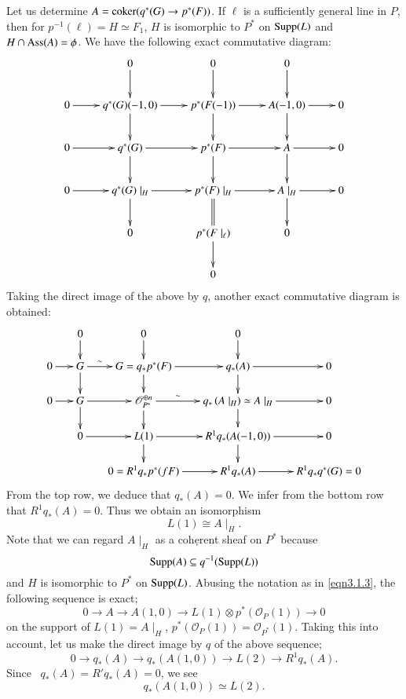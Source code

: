 Let us determine $A=\operatorname{coker} (q^{\ast}(G)\to p^{\ast}(F))$. If
$\ell$ is a sufficiently general line in $P$, then for
$p^{-1}(\ell)=H\simeq F_1$, $H$ is isomorphic to $P^{\ast}$ on
$\mathrm{Supp}(L)$ and $H\cap\mathrm{Ass} (A)=\phi$. We have the following exact
commutative diagram:
$$
\xymatrix{& 0\ar[d] & 0\ar[d] & 0\ar[d] &\\
0\ar[r]&q^{\ast}(G)(-1,0)\ar[d]\ar[r]&p^{\ast}(F(-1))\ar[d]\ar[r]&A(-1,0)\ar[d]\ar[r]&0\\
0\ar[r]&q^{\ast}(G)\ar[d]\ar[r]&p^{\ast}(F)\ar[d]\ar[r]&A\ar[d]\ar[r]&0\\
0\ar[r]&q^{\ast}(G)\mid_{H}\ar[d]\ar[r]&p^{\ast}(F)\mid_{H}\ar@{=}[d]\ar[r]&A\mid_{H}\ar[d]\ar[r]&0\\
& 0 &p^{\ast}(F\mid_{\ell})\ar[d]& 0 &\\
& & 0 & &}
$$\pageoriginale
Taking the direct image of the above by $q$, another exact commutative
diagram is obtained: 
$$
\xymatrix@=.55cm{&0\ar[d]& 0 \ar[d]& 0\ar[d]\\
0\ar[r]&G\ar[d]\ar[r]^-{\sim}&G=q_{\ast}p^{\ast}(F)\ar[d]\ar[r]&q_{\ast}(A)\ar[d]\ar[r]&0\\
0\ar[r]&G\ar[d]\ar[r]&\mathscr{O}_{P^{\ast}}^{\oplus
  n}\ar[d]\ar[r]^-{\sim}&q_{\ast}\left(A\mid_{H}\right)\simeq
A\mid_H\ar[d]\ar[r]&0\\
& 0\ar[r]&L(1)\ar[d]\ar[r]&R^{1}q_{\ast}(A(-1,0))\ar[d]\ar[r]&0\\
& & 0=R^{1}q_{\ast}p^{\ast}(fF)\ar[r]&R^{1}q_{\ast}(A)\ar[r]& R^{1}q_{\ast}q^{\ast}(G)=0}
$$
From the top row, we deduce that $q_{\ast}(A)=0$. We infer from the
bottom row that $R^{1}q_{\ast}(A)=0$. Thus we obtain an isomorphism 
\begin{equation*}\label{eqn3.1.3}
L(1)\cong A\mid_{H}.\tag{3.3}
\end{equation*}\pageoriginale
Note that we can regard $A\mid_H$ as a coh\d{e}rent sheaf on
$P^{\ast}$ because 
$$
\mathrm{Supp}(A)\subseteq q^{-1}(\mathrm{Supp}(L))
$$ 
and $H$ is
isomorphic to $P^{\ast}$ on $\mathrm{Supp}(L)$. Abusing the notation as in
\eqref{eqn3.1.3}, the following sequence is exact; 
$$
0\to A\to A(1,0)\to L(1)\otimes p^{\ast}(\mathscr{O}_P(1))\to 0
$$
on the support of $L(1)=A\mid_{H}$,
$p^{\ast}(\mathscr{O}_P(1))=\mathscr{O}_{P^{\ast}}(1)$. Taking this
into account, let us make the direct image by $q$ of the above
sequence; 
$$
0\to q_{\ast}(A)\to q_{\ast}(A(1,0))\to L(2)\to R^{1} q_{\ast}(A).
$$
Since \ $q_{\ast}(A)=R' q_{\ast}(A)=0$, we see 
\begin{equation*}
q_{\ast}(A(1,0))\simeq L(2).\tag{3.4}\label{eqn3.1.4}
\end{equation*}

